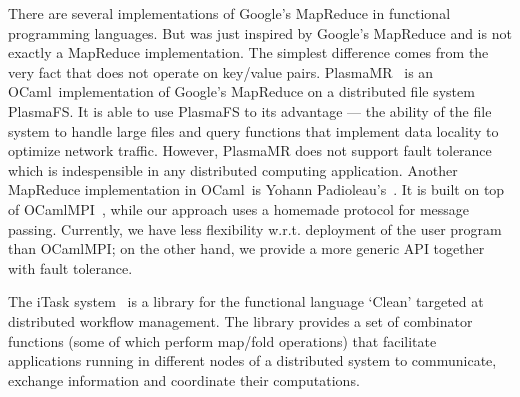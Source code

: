 \documentclass{llncs}
\newcommand{\Ocaml}{OCaml}
\begin{document}
There are several implementations of Google's MapReduce in functional
programming languages. But  was just inspired by Google's
MapReduce and is not exactly a MapReduce implementation. The
simplest difference comes from the very fact that  does not
operate on key/value pairs. 
PlasmaMR~\cite{plasma} is an \Ocaml\ implementation of Google's
MapReduce on a distributed file system PlasmaFS. It is able to use
PlasmaFS to its advantage --- the ability of the file system to handle
large files and query functions that implement data locality to
optimize network traffic. However, PlasmaMR does not support fault
tolerance which is indespensible in any distributed computing
application.
Another MapReduce
implementation in \Ocaml\ is Yohann
Padioleau's~\cite{poor-man-mapreduce}.  It is built on
top of OCamlMPI~\cite{ocamlMPI}, while our approach uses a homemade
protocol for message passing. Currently, we have less flexibility
w.r.t. deployment of the user program than OCamlMPI; on the other
hand, we provide a more generic API together with fault tolerance.

The iTask system~\cite{iTask} is a library for the functional language
`Clean' targeted at distributed workflow management. The library
provides a set of combinator functions (some of which perform map/fold
operations) that facilitate applications running in different nodes
of a distributed system to communicate, exchange information and
coordinate their computations.
\end{document}
